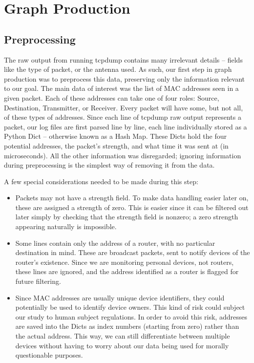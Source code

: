 \section{Graph Production}

\subsection{Preprocessing}


The raw output from running tcpdump contains many irrelevant details -- fields like the type of packet, or the antenna used.
As such, our first step in graph production was to preprocess this data, preserving only the information relevant to our goal.
The main data of interest was the list of MAC addresses seen in a given packet.
Each of these addresses can take one of four roles: Source, Destination, Transmitter, or Receiver.
Every packet will have some, but not all, of these types of addresses.
Since each line of tcpdump raw output represents a packet, our log files are first parsed line by line, each line individually stored as a Python Dict -- otherwise known as a Hash Map.
These Dicts hold the four potential addresses, the packet's strength, and what time it was sent at (in microseconds).
All the other information was disregarded; ignoring information during preprocessing is the simplest way of removing it from the data.

A few special considerations needed to be made during this step:
\begin{itemize}
\item Packets may not have a strength field.
  To make data handling easier later on, these are assigned a strength of zero.
  This is easier since it can be filtered out later simply by checking that the strength field is nonzero; a zero strength appearing naturally is impossible. 
\item Some lines contain only the address of a router, with no particular destination in mind.
  These are broadcast packets, sent to notify devices of the router's existence.
  Since we are monitoring personal devices, not routers, these lines are ignored, and the address identified as a router is flagged for future filtering.
\item Since MAC addresses are usually unique device identifiers, they could potentially be used to identify device owners.
  This kind of risk could subject our study to human subject regulations.
  In order to avoid this risk, addresses are saved into the Dicts as index numbers (starting from zero) rather than the actual address.
  This way, we can still differentiate between multiple devices without having to worry about our data being used for morally questionable purposes.
\end{itemize}

